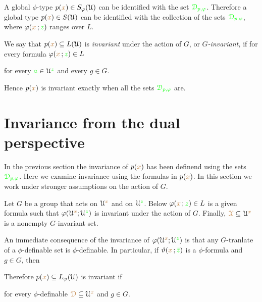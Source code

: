 A global $\phi$-type $p({\color{brown} x})\in S_\varphi(\EuScript U)$ can be identified with the set ${\color{green}\EuScript D_{p,\varphi}}$.
Therefore a global type $p({\color{brown} x})\in S(\EuScript U)$ can be identified with the collection of the sets ${\color{green}\EuScript D_{p,\varphi}}$, where $\varphi({\color{brown} x}\,;{\color{green} z})$ ranges over $L$.

We say that $p({\color{brown} x})\subseteq L(\EuScript U)$ is \emph{invariant\/} under the action of $G$, or \emph{$G$-invariant,} if for every formula $\varphi({\color{brown} x}\,;{\color{green} z})\in L$ 

\hfill for every ${\color{green} a}\in\EuScript U^{\color{green} z}$ and every $g\in G$.

Hence $p({\color{brown} x})$ is invariant exactly when all the sets $\color{green}\EuScript D_{p,\varphi}$ are.

\section{Invariance from the dual perspective}\label{dual_perspective}

In the previous section the invariance of $p({\color{brown} x})$ has been definend using the sets ${\color{green}\EuScript D_{p,\varphi}}$.
Here we examine invariance using the formulas in $p({\color{brown} x})$.
In this section we  work under stronger assumptions on the action of $G$.

\begin{assumption}\label{notation_GXphi}
  Let $G$ be a group that acts on $\EuScript U^{\color{brown} x}$ and on $\EuScript U^{\color{green} z}$.
  Below $\varphi({\color{brown} x}\,;{\color{green} z})\in L$ is a given formula such that $\varphi(\EuScript U^{\color{brown} x};\EuScript U^{\color{green} z})$ is invariant under the action of $G$.
  Finally, ${\color{brown}\EuScript X}\subseteq\EuScript U^{\color{brown} x}$ is a nonempty $G$-invariant set.
\end{assumption}

An immediate consequence of the invariance of $\varphi(\EuScript U^{\color{brown} x};\EuScript U^{\color{green} z})$ is 
that any $G$-tranlate of a $\phi$-definable set is $\phi$-definable.
In particular, if $\vartheta({\color{brown} x}\,;{\color{green}\bar z})$ is a $\phi$-formula and $g\in G$, then 


Therefore $p({\color{brown} x})\subseteq L_\varphi(\EuScript U)$ is invariant if

\hfill for every $\phi$-definable ${\color{brown}\EuScript D}\subseteq\EuScript U^{\color{brown} x}$ and $g\in G$.

